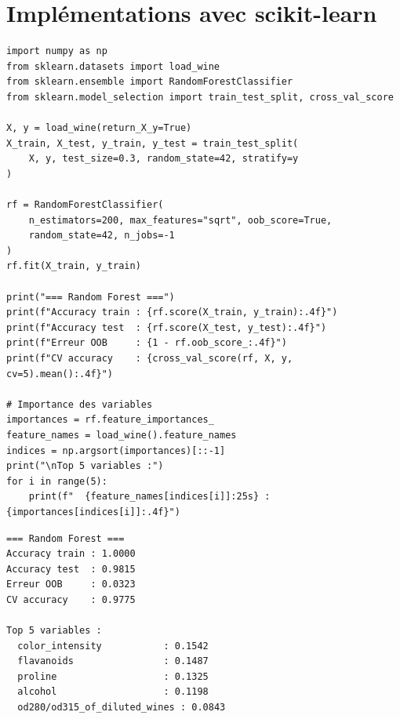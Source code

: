 \section{Impl\'ementations avec scikit-learn}
\label{sec:ensembles-sklearn}

\begin{codeblock}[title=\textbf{Random Forest}]
\begin{verbatim}
import numpy as np
from sklearn.datasets import load_wine
from sklearn.ensemble import RandomForestClassifier
from sklearn.model_selection import train_test_split, cross_val_score

X, y = load_wine(return_X_y=True)
X_train, X_test, y_train, y_test = train_test_split(
    X, y, test_size=0.3, random_state=42, stratify=y
)

rf = RandomForestClassifier(
    n_estimators=200, max_features="sqrt", oob_score=True,
    random_state=42, n_jobs=-1
)
rf.fit(X_train, y_train)

print("=== Random Forest ===")
print(f"Accuracy train : {rf.score(X_train, y_train):.4f}")
print(f"Accuracy test  : {rf.score(X_test, y_test):.4f}")
print(f"Erreur OOB     : {1 - rf.oob_score_:.4f}")
print(f"CV accuracy    : {cross_val_score(rf, X, y, cv=5).mean():.4f}")

# Importance des variables
importances = rf.feature_importances_
feature_names = load_wine().feature_names
indices = np.argsort(importances)[::-1]
print("\nTop 5 variables :")
for i in range(5):
    print(f"  {feature_names[indices[i]]:25s} : {importances[indices[i]]:.4f}")
\end{verbatim}
\end{codeblock}

\begin{codeoutput}
\begin{verbatim}
=== Random Forest ===
Accuracy train : 1.0000
Accuracy test  : 0.9815
Erreur OOB     : 0.0323
CV accuracy    : 0.9775

Top 5 variables :
  color_intensity           : 0.1542
  flavanoids                : 0.1487
  proline                   : 0.1325
  alcohol                   : 0.1198
  od280/od315_of_diluted_wines : 0.0843
\end{verbatim}
\end{codeoutput}

